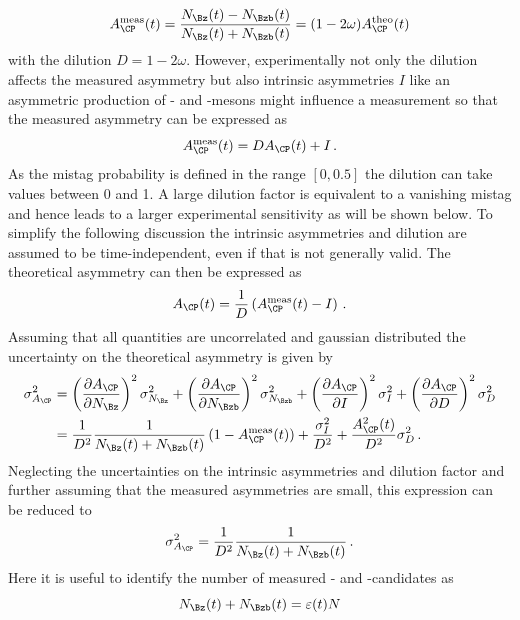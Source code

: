 \begin{equation}
A_{\CP}^{\text{meas}}(t)=\frac{N_{\Bz}(t)-N_{\Bzb}(t)}{N_{\Bz}(t)+N_{\Bzb}(t)}=(1-2\omega)A_{\CP}^{\text{theo}}(t)
\end{equation}
with the dilution $D=1-2\omega$.
However, experimentally not only the dilution affects the measured asymmetry but also intrinsic asymmetries $I$ like an asymmetric production of \Bz- and \Bzb-mesons might influence a measurement so that the measured asymmetry can be expressed as
\begin{equation}
A_{\CP}^{\text{meas}}(t)=DA_{\CP}(t)+I\,.
\end{equation}
As the mistag probability is defined in the range $[0, 0.5]$ the dilution can take values between \num{0} and \num{1}.
A large dilution factor is equivalent to a vanishing mistag and hence leads to a larger experimental sensitivity as will be shown below.
To simplify the following discussion the intrinsic asymmetries and dilution are assumed to be time-independent, even if that is not generally valid.
The theoretical asymmetry can then be expressed as
\begin{equation}
A_{\CP}(t)=\frac{1}{D}\left(A_{\CP}^{\text{meas}}(t)-I\right)\,.
\end{equation}
Assuming that all quantities are uncorrelated and gaussian distributed the uncertainty on the theoretical asymmetry is given by
\begin{equation}
\begin{aligned}
\sigma_{A_{\CP}}^2&=\left(\frac{\partial A_{\CP}}{\partial N_{\Bz}}\right)^2\sigma_{N_{\Bz}}^2+\left(\frac{\partial A_{\CP}}{\partial N_{\Bzb}}\right)^2\sigma_{N_{\Bzb}}^2+\left(\frac{\partial A_{\CP}}{\partial I}\right)^2\sigma_{I}^2+\left(\frac{\partial A_{\CP}}{\partial D}\right)^2\sigma_{D}^2\\
&=\frac{1}{D^2}\frac{1}{N_{\Bz}(t)+N_{\Bzb}(t)}\left(1-A_{\CP}^{\text{meas}}(t)\right)+\frac{\sigma_{I}^2}{D^2}+\frac{A_{\CP}^2(t)}{D^2}\sigma_{D}^2\,.
\end{aligned}
\end{equation}
Neglecting the uncertainties on the intrinsic asymmetries and dilution factor and further assuming that the measured asymmetries are small, this expression can be reduced to
\begin{equation}
\sigma_{A_{\CP}}^2=\frac{1}{D^2}\frac{1}{N_{\Bz}(t)+N_{\Bzb}(t)}\,.
\end{equation}
Here it is useful to identify the number of measured \Bz- and \Bzb-candidates as
\begin{equation}
N_{\Bz}(t)+N_{\Bzb}(t)=\varepsilon(t)N
\end{equation}
